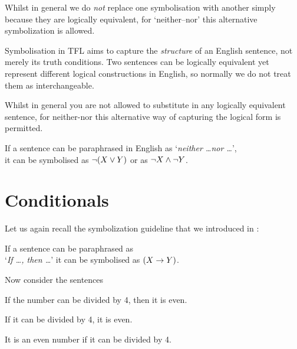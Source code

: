 Whilst in general we do \emph{not} replace one symbolisation with another simply because they are logically equivalent, for `neither--nor' this alternative symbolization is allowed. 

Symbolisation in TFL aims to capture the \emph{structure} of an English sentence, not merely its truth conditions. Two sentences can be logically equivalent yet represent different logical constructions in English, so normally we do not treat them as interchangeable.


Whilst in general you are not allowed to substitute in any logically equivalent sentence, for neither-nor this alternative way of capturing the logical form is permitted.

\begin{highlighted}
	If a sentence can be paraphrased in English as `\emph{neither \ldots nor \ldots}',\\ it can be symbolised as $\neg(X\vee Y)$ or as $\neg X\mathbin{\wedge}\neg Y$.\end{highlighted}

\section{Conditionals}
Let us again recall the symbolization guideline that we introduced in :
	\begin{highlighted}
	 If a sentence can be paraphrased as \\`\emph{If \ldots, then \ldots}' it can be symbolised as $(X\rightarrow Y)$.
	\end{highlighted}


\noindent Now consider the sentences
\begin{samplesent}
	\item\label{sent:if1} If the number can be divided by 4, then it is even. 
		\item\label{sent:if3} If it can be divided by 4, it is even. 
		\item\label{sent:if4} It is an even number if it can be divided by 4.
\end{samplesent}

